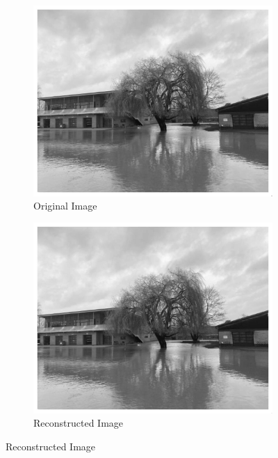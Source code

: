 \documentclass[11pt]{article}
\begin{document}
\begin{figure}[H]
    \centering
    \begin{subfigure}{.45\textwidth}
        \centering
        \includegraphics[width=\linewidth]{figs/q2c_river_side_original.jpeg}
        \caption{Original Image}
        \label{fig:original_image}
    \end{subfigure}%
    \begin{subfigure}{.45\textwidth}
        \centering
        \includegraphics[width=\linewidth]{figs/q2c_river_side_reconstructed.jpeg}
        \caption{Reconstructed Image}
        \label{fig:reconstructed_image}
    \end{subfigure}%
    

\end{figure}
\end{document}
